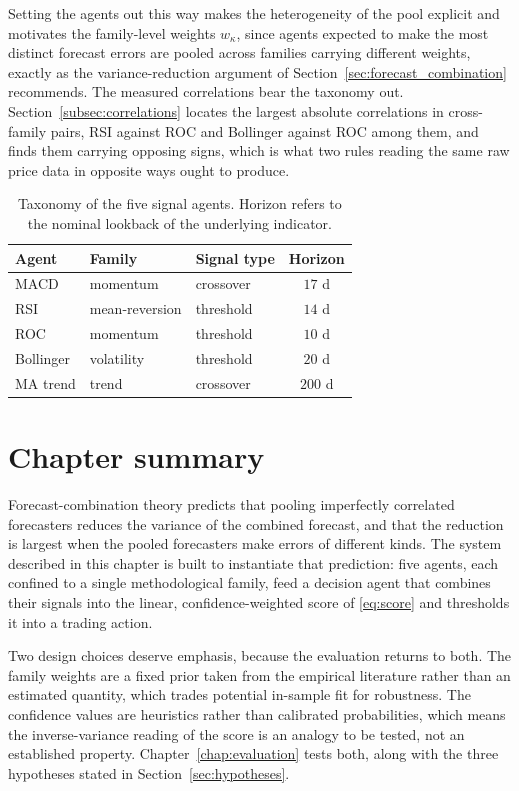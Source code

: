 Setting the agents out this way makes the heterogeneity of the pool explicit and motivates the family-level weights $w_\kappa$, since agents expected to make the most distinct forecast errors are pooled across families carrying different weights, exactly as the variance-reduction argument of Section~\ref{sec:forecast_combination} recommends. The measured correlations bear the taxonomy out. Section~\ref{subsec:correlations} locates the largest absolute correlations in cross-family pairs, RSI against ROC and Bollinger against ROC among them, and finds them carrying opposing signs, which is what two rules reading the same raw price data in opposite ways ought to produce.

\begin{table}[!htbp]
\centering
\caption{Taxonomy of the five signal agents. Horizon refers to the nominal lookback of the underlying indicator.}
\label{tab:taxonomy}
\begin{tabular}{lllc}
\toprule
\textbf{Agent} & \textbf{Family} & \textbf{Signal type} & \textbf{Horizon} \\
\midrule
MACD          & momentum       & crossover & $17$ d \\
RSI           & mean-reversion & threshold & $14$ d \\
ROC           & momentum       & threshold & $10$ d \\
Bollinger     & volatility     & threshold & $20$ d \\
MA trend      & trend          & crossover & $200$ d \\
\bottomrule
\end{tabular}
\end{table}

\section{Chapter summary}\label{sec:design_summary}

Forecast-combination theory predicts that pooling imperfectly correlated forecasters reduces the variance of the combined forecast, and that the reduction is largest when the pooled forecasters make errors of different kinds. The system described in this chapter is built to instantiate that prediction: five agents, each confined to a single methodological family, feed a decision agent that combines their signals into the linear, confidence-weighted score of \eqref{eq:score} and thresholds it into a trading action.

Two design choices deserve emphasis, because the evaluation returns to both. The family weights are a fixed prior taken from the empirical literature rather than an estimated quantity, which trades potential in-sample fit for robustness. The confidence values are heuristics rather than calibrated probabilities, which means the inverse-variance reading of the score is an analogy to be tested, not an established property. Chapter~\ref{chap:evaluation} tests both, along with the three hypotheses stated in Section~\ref{sec:hypotheses}.
